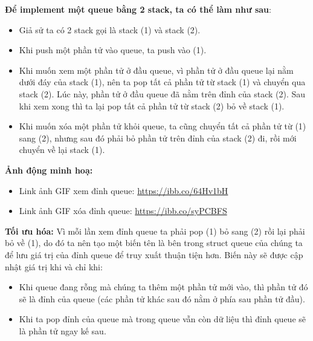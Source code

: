 \documentclass[main.tex]{subfiles}
\begin{document}
\textbf{Để implement một queue bằng 2 stack, ta có thể làm như sau}:
\begin{itemize}
    \item Giả sử ta có 2 stack gọi là stack (1) và stack (2).
    \item Khi push một phần tử vào queue, ta push vào (1).
    \item Khi muốn xem một phần tử ở đầu queue, vì phần tử ở đầu queue lại nằm dưới đáy của stack (1), nên ta pop tất cả phần tử từ stack (1) và chuyển qua stack (2). Lúc này, phần tử ở đầu queue đã nằm trên đỉnh của stack (2). Sau khi xem xong thì ta lại pop tất cả phần tử từ stack (2) bỏ về stack (1).
    \item Khi muốn xóa một phần tử khỏi queue, ta cũng chuyển tất cả phần tử từ (1) sang (2), nhưng sau đó phải bỏ phần tử trên đỉnh của stack (2) đi, rồi mới chuyển về lại stack (1).
\end{itemize}

\textbf{Ảnh động minh hoạ:}
\begin{itemize}
    \item Link ảnh GIF xem đỉnh queue: \href{https://ibb.co/64Hv1bH}{https://ibb.co/64Hv1bH}
    \item Link ảnh GIF xóa đỉnh queue: \href{https://ibb.co/syPCBFS}{https://ibb.co/syPCBFS}
\end{itemize}

\textbf{ Tối ưu hóa:}
Vì mỗi lần xem đỉnh queue ta phải pop (1) bỏ sang (2) rồi lại phải bỏ về (1), do đó ta nên tạo một biến tên là  bên trong struct queue của chúng ta để lưu giá trị của đỉnh queue để truy xuất thuận tiện hơn. Biến này sẽ được cập nhật giá trị khi và chỉ khi:
\begin{itemize}
    \item Khi queue đang rỗng mà chúng ta thêm một phần tử mới vào, thì phần tử đó sẽ là đỉnh của queue (các phần tử khác sau đó nằm ở phía sau phần tử đầu).
    \item Khi ta pop đỉnh của queue mà trong queue vẫn còn dữ liệu thì đỉnh queue sẽ là phần tử ngay kế sau.
\end{itemize}
\end{document}
